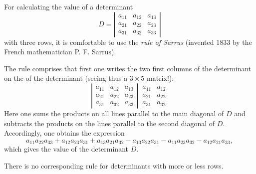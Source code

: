 \documentclass[12pt]{article}
\theoremstyle{definition}
\begin{document}
For calculating the value of a determinant 
$$D = 
\left|\begin{matrix}
a_{11} & a_{12} & a_{13}\\
a_{21} & a_{22} & a_{23}\\
a_{31} & a_{32} & a_{33}
\end{matrix}\right|
$$
with three rows, it is comfortable to use the {\em rule of Sarrus} (invented 1833 by the French mathematician P. F. Sarrus). 

The rule comprises that first one writes the two first columns of the determinant on the  of the determinant (seeing thus a $3\!\times\!5$ matrix!): 
$$
\left|\begin{matrix}
a_{11} & a_{12} & a_{13}\\
a_{21} & a_{22} & a_{23}\\
a_{31} & a_{32} & a_{33}
\end{matrix}\right|
\begin{matrix}
\,a_{11} & a_{12}\\
\,a_{21} & a_{22}\\
\,a_{31} & a_{32}
\end{matrix}
$$
Here one sums the products on all lines parallel to the main diagonal of $D$ and subtracts the products on the lines parallel to the second diagonal of $D$.  Accordingly, one obtains the expression
$$a_{11}a_{22}a_{33}+a_{12}a_{23}a_{31}+a_{13}a_{21}a_{32}
 -a_{13}a_{22}a_{31}-a_{11}a_{23}a_{32}-a_{12}a_{21}a_{33},$$
which gives the value of the determinant $D$.

There is no corresponding rule for determinants with more or less rows.   


\end{document}
